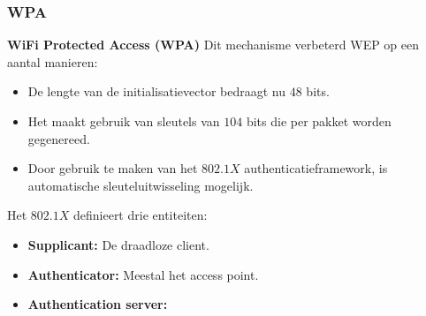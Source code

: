\documentclass{report}
\begin{document}
	\subsubsection{WPA}
	\textbf{WiFi Protected Access (WPA)}
	Dit mechanisme verbeterd WEP op een aantal manieren:
	\begin{itemize}
		\item[\good] De lengte van de initialisatievector bedraagt nu $48$ bits. 
		\item[\good] Het maakt gebruik van sleutels van $104$ bits die per pakket worden gegenereed.
		\item[\good] Door gebruik te maken van het $802.1X$ authenticatieframework, is automatische sleuteluitwisseling mogelijk.
	\end{itemize}
	Het $802.1X$ definieert drie entiteiten:
	\begin{itemize}
		\item[\good] \textbf{Supplicant:} De draadloze client.
		\item[\good] \textbf{Authenticator:} Meestal het access point.
		\item[\good] \textbf{Authentication server:} 
	\end{itemize}
\end{document}
